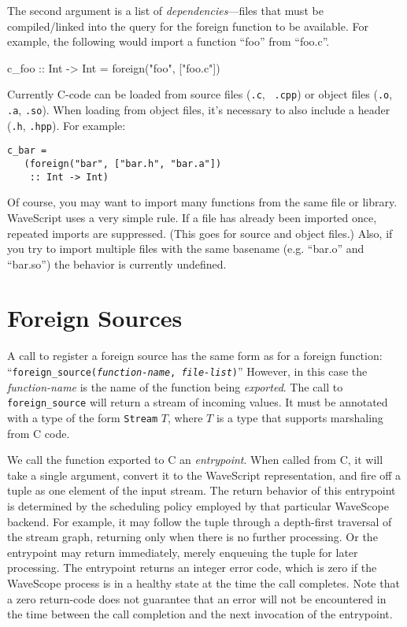 The second argument is a list of {\em dependencies}---files that must
be compiled/linked into the query for the foreign function to be
available.
%
For example, the following would import a function ``foo'' from ``foo.c''.

\begin{wscode}
c\_foo :: Int -> Int = foreign("foo", ["foo.c"])
\end{wscode}


Currently C-code can be loaded from source files ({\tt .c}, {\tt
  .cpp}) or object files ({\tt .o}, {\tt .a}, {\tt .so}).  When
  loading from object files, it's necessary to also include a header
  ({\tt .h}, {\tt .hpp}).  For example:

\begin{verbatim}
c_bar = 
   (foreign("bar", ["bar.h", "bar.a"]) 
    :: Int -> Int)
\end{verbatim}

Of course, you may want to import many functions from the same file or
library.  WaveScript uses a very simple rule.  If a file has already
been imported once, repeated imports are suppressed.  (This goes for
source and object files.)  Also, if you try to import multiple files with
the same basename (e.g. ``bar.o'' and ``bar.so'') the behavior is
currently undefined.





\section{Foreign Sources}

A call to register a foreign source has the same form as for a foreign
function: \\
``{\tt foreign\_source({\em function-name}, {\em file-list})}''
However, in this case the {\em function-name} is the
name of the function being {\em exported}.  The call to {\tt
foreign\_source} will return a stream of incoming values.  It must be
annotated with a type of the form {\tt Stream} $T$, where $T$ is a
type that supports marshaling from C code.

We call the function exported to C an {\em entrypoint}.  When called
from C, it will take a single argument, convert it to the WaveScript
representation, and fire off a tuple as one element of the input
stream.  The return behavior of this entrypoint is determined by the
scheduling policy employed by that particular WaveScope backend.  For
example, it may follow the tuple through a depth-first traversal of
the stream graph, returning only when there is no further processing.
Or the entrypoint may return immediately, merely enqueuing
the tuple for later processing.  The entrypoint returns an integer
error code, which is zero if the WaveScope process is in a
healthy state at the time the call completes.  Note that a zero
return-code does not guarantee that an error will not be encountered
in the time between the call completion and the next invocation of the
entrypoint. 


